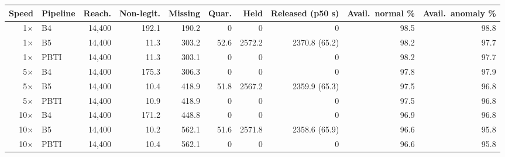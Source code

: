 \begin{tabular}{rlrrrrrrrr}
\toprule
\textbf{Speed} & \textbf{Pipeline} & \textbf{Reach.} & \textbf{Non-legit.} & \textbf{Missing} & \textbf{Quar.} & \textbf{Held} & \textbf{Released (p50 s)} & \textbf{Avail.\ normal \%} & \textbf{Avail.\ anomaly \%}\\
\midrule
1$\times$ & B4 & 14{,}400 & 192.1 & 190.2 & 0 & 0 & 0 & 98.5 & 98.8\\
1$\times$ & B5 & 14{,}400 & 11.3 & 303.2 & 52.6 & 2572.2 & 2370.8 (65.2) & 98.2 & 97.7\\
1$\times$ & PBTI & 14{,}400 & 11.3 & 303.1 & 0 & 0 & 0 & 98.2 & 97.7\\
5$\times$ & B4 & 14{,}400 & 175.3 & 306.3 & 0 & 0 & 0 & 97.8 & 97.9\\
5$\times$ & B5 & 14{,}400 & 10.4 & 418.9 & 51.8 & 2567.2 & 2359.9 (65.3) & 97.5 & 96.8\\
5$\times$ & PBTI & 14{,}400 & 10.9 & 418.9 & 0 & 0 & 0 & 97.5 & 96.8\\
10$\times$ & B4 & 14{,}400 & 171.2 & 448.8 & 0 & 0 & 0 & 96.9 & 96.8\\
10$\times$ & B5 & 14{,}400 & 10.2 & 562.1 & 51.6 & 2571.8 & 2358.6 (65.9) & 96.6 & 95.8\\
10$\times$ & PBTI & 14{,}400 & 10.4 & 562.1 & 0 & 0 & 0 & 96.6 & 95.8\\
\bottomrule
\end{tabular}